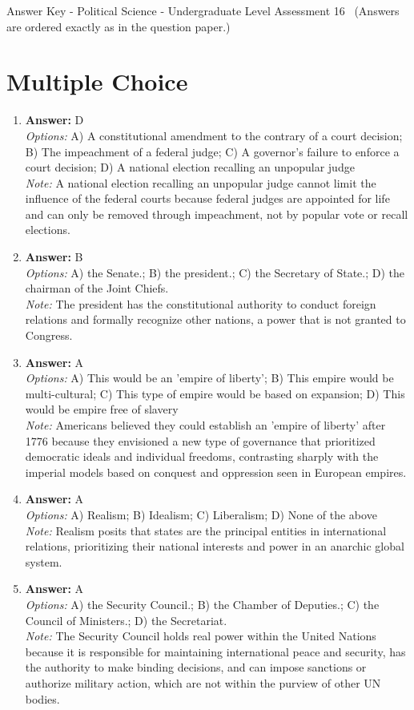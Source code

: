 \documentclass[12pt]{article}
\begin{document}
\begin{center}
Answer Key - Political Science - Undergraduate Level Assessment 16 \
\small (Answers are ordered exactly as in the question paper.)
\end{center}

\section*{Multiple Choice}
\begin{enumerate}[label=\arabic*.]
\item \textbf{Answer:} D
\\ \textit{Options:} A) A constitutional amendment to the contrary of a court decision; B) The impeachment of a federal judge; C) A governor's failure to enforce a court decision; D) A national election recalling an unpopular judge
\\ \textit{Note:} A national election recalling an unpopular judge cannot limit the influence of the federal courts because federal judges are appointed for life and can only be removed through impeachment, not by popular vote or recall elections.
\item \textbf{Answer:} B
\\ \textit{Options:} A) the Senate.; B) the president.; C) the Secretary of State.; D) the chairman of the Joint Chiefs.
\\ \textit{Note:} The president has the constitutional authority to conduct foreign relations and formally recognize other nations, a power that is not granted to Congress.
\item \textbf{Answer:} A
\\ \textit{Options:} A) This would be an 'empire of liberty'; B) This empire would be multi-cultural; C) This type of empire would be based on expansion; D) This would be empire free of slavery
\\ \textit{Note:} Americans believed they could establish an 'empire of liberty' after 1776 because they envisioned a new type of governance that prioritized democratic ideals and individual freedoms, contrasting sharply with the imperial models based on conquest and oppression seen in European empires.
\item \textbf{Answer:} A
\\ \textit{Options:} A) Realism; B) Idealism; C) Liberalism; D) None of the above
\\ \textit{Note:} Realism posits that states are the principal entities in international relations, prioritizing their national interests and power in an anarchic global system.
\item \textbf{Answer:} A
\\ \textit{Options:} A) the Security Council.; B) the Chamber of Deputies.; C) the Council of Ministers.; D) the Secretariat.
\\ \textit{Note:} The Security Council holds real power within the United Nations because it is responsible for maintaining international peace and security, has the authority to make binding decisions, and can impose sanctions or authorize military action, which are not within the purview of other UN bodies.
\end{enumerate}
\end{document}
